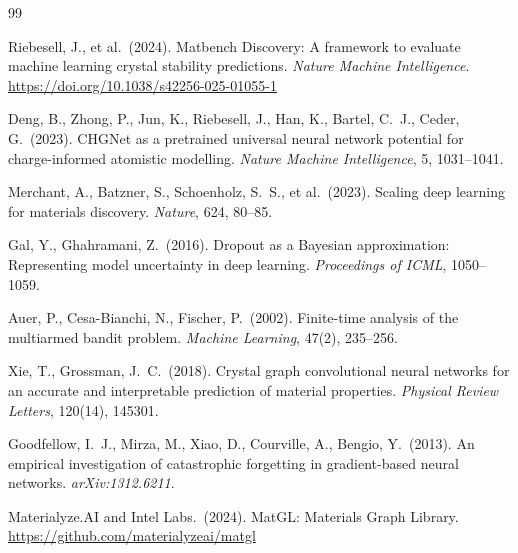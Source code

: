 \documentclass{article}
\begin{document}
\begin{thebibliography}{99}

Riebesell, J., et al.\ (2024).
Matbench Discovery: A framework to evaluate machine learning crystal stability
predictions.
\textit{Nature Machine Intelligence}.
\url{https://doi.org/10.1038/s42256-025-01055-1}

Deng, B., Zhong, P., Jun, K., Riebesell, J., Han, K., Bartel, C.\ J.,
Ceder, G.\ (2023).
CHGNet as a pretrained universal neural network potential for
charge-informed atomistic modelling.
\textit{Nature Machine Intelligence}, 5, 1031--1041.

Merchant, A., Batzner, S., Schoenholz, S.\ S., et al.\ (2023).
Scaling deep learning for materials discovery.
\textit{Nature}, 624, 80--85.

Gal, Y., Ghahramani, Z.\ (2016).
Dropout as a Bayesian approximation: Representing model uncertainty in deep
learning.
\textit{Proceedings of ICML}, 1050--1059.

Auer, P., Cesa-Bianchi, N., Fischer, P.\ (2002).
Finite-time analysis of the multiarmed bandit problem.
\textit{Machine Learning}, 47(2), 235--256.

Xie, T., Grossman, J.\ C.\ (2018).
Crystal graph convolutional neural networks for an accurate and interpretable
prediction of material properties.
\textit{Physical Review Letters}, 120(14), 145301.

Goodfellow, I.\ J., Mirza, M., Xiao, D., Courville, A., Bengio, Y.\ (2013).
An empirical investigation of catastrophic forgetting in gradient-based neural
networks.
\textit{arXiv:1312.6211}.

Materialyze.AI and Intel Labs.\ (2024).
MatGL: Materials Graph Library.
\url{https://github.com/materialyzeai/matgl}

\end{thebibliography}
\end{document}
